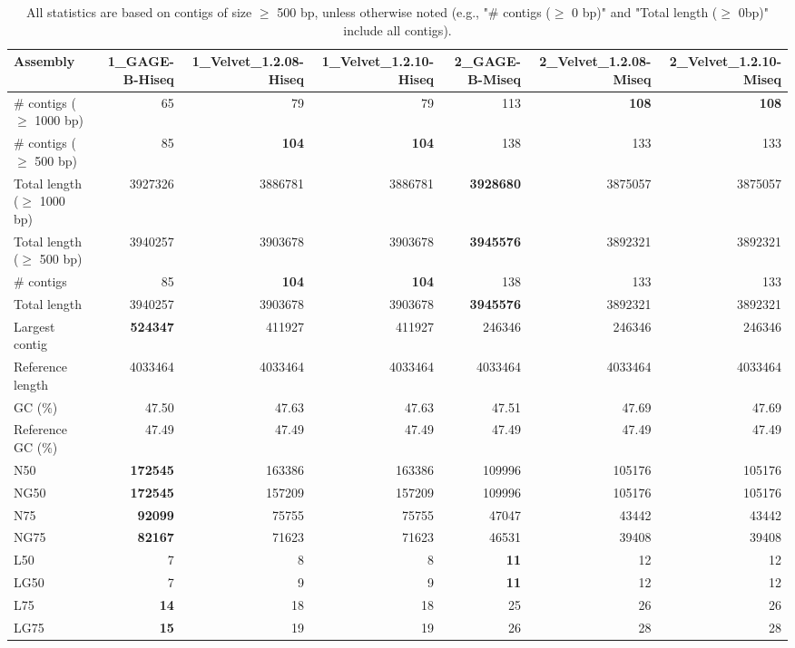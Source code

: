 \documentclass[12pt,a4paper]{article}
\begin{document}
\begin{table}[ht]
\begin{center}
\caption{All statistics are based on contigs of size $\geq$ 500 bp, unless otherwise noted (e.g., "\# contigs ($\geq$ 0 bp)" and "Total length ($\geq$ 0bp)" include all contigs).}
\begin{tabular}{|l*{6}{|r}|}
\hline
Assembly & 1\_GAGE-B-Hiseq & 1\_Velvet\_1.2.08-Hiseq & 1\_Velvet\_1.2.10-Hiseq & 2\_GAGE-B-Miseq & 2\_Velvet\_1.2.08-Miseq & 2\_Velvet\_1.2.10-Miseq \\ \hline
\# contigs ($\geq$ 1000 bp) & 65 & 79 & 79 & 113 & {\bf 108} & {\bf 108} \\ \hline
\# contigs ($\geq$ 500 bp) & 85 & {\bf 104} & {\bf 104} & 138 & 133 & 133 \\ \hline
Total length ($\geq$ 1000 bp) & 3927326 & 3886781 & 3886781 & {\bf 3928680} & 3875057 & 3875057 \\ \hline
Total length ($\geq$ 500 bp) & 3940257 & 3903678 & 3903678 & {\bf 3945576} & 3892321 & 3892321 \\ \hline
\# contigs & 85 & {\bf 104} & {\bf 104} & 138 & 133 & 133 \\ \hline
Total length & 3940257 & 3903678 & 3903678 & {\bf 3945576} & 3892321 & 3892321 \\ \hline
Largest contig & {\bf 524347} & 411927 & 411927 & 246346 & 246346 & 246346 \\ \hline
Reference length & 4033464 & 4033464 & 4033464 & 4033464 & 4033464 & 4033464 \\ \hline
GC (\%) & 47.50 & 47.63 & 47.63 & 47.51 & 47.69 & 47.69 \\ \hline
Reference GC (\%) & 47.49 & 47.49 & 47.49 & 47.49 & 47.49 & 47.49 \\ \hline
N50 & {\bf 172545} & 163386 & 163386 & 109996 & 105176 & 105176 \\ \hline
NG50 & {\bf 172545} & 157209 & 157209 & 109996 & 105176 & 105176 \\ \hline
N75 & {\bf 92099} & 75755 & 75755 & 47047 & 43442 & 43442 \\ \hline
NG75 & {\bf 82167} & 71623 & 71623 & 46531 & 39408 & 39408 \\ \hline
L50 & 7 & 8 & 8 & {\bf 11} & 12 & 12 \\ \hline
LG50 & 7 & 9 & 9 & {\bf 11} & 12 & 12 \\ \hline
L75 & {\bf 14} & 18 & 18 & 25 & 26 & 26 \\ \hline
LG75 & {\bf 15} & 19 & 19 & 26 & 28 & 28 \\ \hline

\end{tabular}
\end{center}
\end{table}
\end{document}
